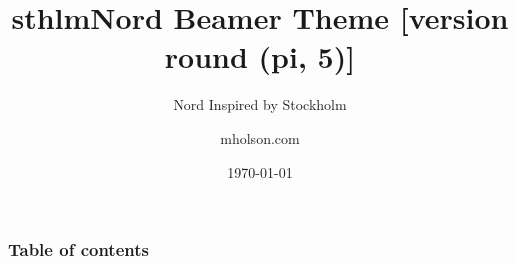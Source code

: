 \documentclass[aspectratio=169, sectionpages, codemintedoverleaf, bibref]{beamer}
\title{sthlmNord Beamer Theme [version round (pi, 5)]}
\subtitle{Nord Inspired by Stockholm}
\author{mholson.com}
\institute{School in Stockholm}
\date{\today}
\begin{document}
\titlepage

\begin{frame}
	\frametitle{Table of contents}
	\tableofcontents
\end{frame}
\end{document}
